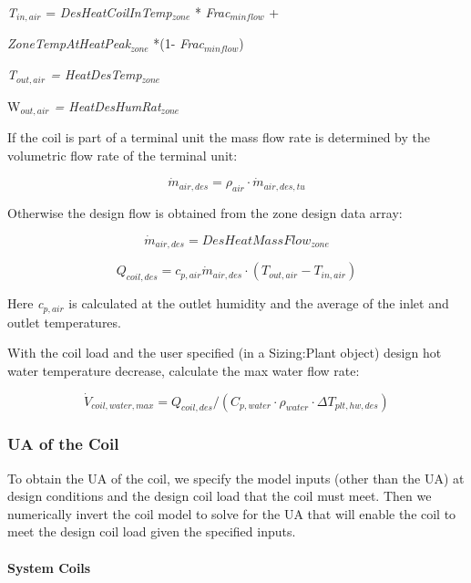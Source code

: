 \emph{T\(_{in,air}\)} = \emph{DesHeatCoilInTemp\(_{zone}\)} * \emph{Frac\(_{minflow}\)} +

\emph{ZoneTempAtHeatPeak\(_{zone}\)} *(1- \emph{Frac\(_{minflow}\)})

\emph{T\(_{out,air}\) = HeatDesTemp\(_{zone}\)}

W\emph{\(_{out,air}\) = HeatDesHumRat\(_{zone}\)}

If the coil is part of a terminal unit the mass flow rate is determined by the volumetric flow rate of the terminal unit:

\begin{equation}
\dot m_{air,des} = \rho_{air} \cdot \dot m_{air,des,tu}
\end{equation}

Otherwise the design flow is obtained from the zone design data array:

\begin{equation}
\dot m_{air,des} = DesHeatMassFlow_{zone}
\end{equation}

\begin{equation}
Q_{coil,des} = c_{p,air} \dot m_{air,des} \cdot (T_{out,air} - T_{in,air})
\end{equation}

Here \emph{c\(_{p,air}\)} is calculated at the outlet humidity and the average of the inlet and outlet temperatures.

With the coil load and the user specified (in a Sizing:Plant object) design hot water temperature decrease, calculate the max water flow rate:

\begin{equation}
\dot V_{coil,water,max} = Q_{coil,des}/(C_{p,water} \cdot \rho_{water} \cdot \Delta T_{plt,hw,des})
\end{equation}

\subsubsection{UA of the Coil}\label{ua-of-the-coil}

To obtain the UA of the coil, we specify the model inputs (other than the UA) at design conditions and the design coil load that the coil must meet. Then we numerically invert the coil model to solve for the UA that will enable the coil to meet the design coil load given the specified inputs.

\paragraph{System Coils}\label{system-coils-1}

